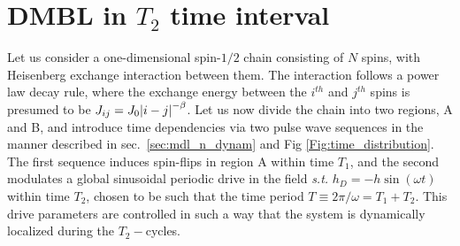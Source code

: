 \documentclass[%
nofootinbib,
reprint,
superscriptaddress,
amsmath,amssymb,showkeys,
aps,
prb,
]{revtex4-2}
\begin{document}
	\section{\label{sec:AppendixA} DMBL in $T_2$ time interval}
	
	Let us consider a one-dimensional spin-$1/2$ chain consisting of $N$ spins, with Heisenberg exchange interaction between them. The interaction follows a power law decay rule, where the exchange energy between the $i^{th}$ and $j^{th}$ spins is presumed to be  $J_{ij}=J_0\abs{i-j}^{-\beta}$. Let us now  divide the chain into two regions, A and B, and introduce time dependencies via two pulse wave sequences in the manner described in sec.~\ref{sec:mdl_n_dynam} and Fig \ref{Fig:time_distribution}. The first sequence  induces spin-flips in region A within time $T_1$, and the second modulates a global sinusoidal periodic drive in the field \textit{s.t.} $h_D = -h\sin(\omega t)$ within time $T_2$, chosen to be such that the time period $T\equiv 2\pi/\omega = T_1 + T_2$. This drive parameters are controlled in such a way that the system is dynamically localized during the $T_2-$cycles.
	
\end{document}
